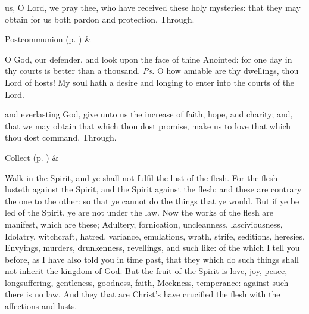 
\postcommunion
{} us, O Lord, we pray thee, who have received these holy mysteries: that they may obtain for us both pardon and protection. Through.


\begin{rubric}
     Postcommunion  (p. \pageref{SPSaints}) \&  
\end{rubric}



\introit
{} O God, our defender, and look upon the face of thine Anointed: for one day in thy courts is better than a thousand. \textit{Ps.} O how amiable are thy dwellings, thou Lord of hosts! My soul hath a desire and longing to enter into the courts of the Lord.

\collect
{} and everlasting God, give unto us the increase of faith, hope, and charity; and, that we may obtain that which thou dost promise, make us to love that which thou dost command. Through.
\begin{rubric}
     Collect  (p. \pageref{SPSaints}) \&  
\end{rubric}

 Walk in the Spirit, and ye shall not fulfil the lust of the flesh. For the flesh lusteth against the Spirit, and the Spirit against the flesh: and these are contrary the one to the other: so that ye cannot do the things that ye would. But if ye be led of the Spirit, ye are not under the law. Now the works of the flesh are manifest, which are these; Adultery, fornication, uncleanness, lasciviousness, Idolatry, witchcraft, hatred, variance, emulations, wrath, strife, seditions, heresies, Envyings, murders, drunkenness, revellings, and such like: of the which I tell you before, as I have also told you in time past, that they which do such things shall not inherit the kingdom of God. But the fruit of the Spirit is love, joy, peace, longsuffering, gentleness, goodness, faith, Meekness, temperance: against such there is no law. And they that are Christ's have crucified the flesh with the affections and lusts.

